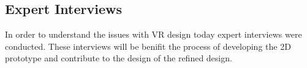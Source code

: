 \subsection{Expert Interviews}
In order to understand the issues with VR design today expert interviews were conducted. These interviews will be benifit the process of developing the 2D prototype and contribute to the design of the refined design.
